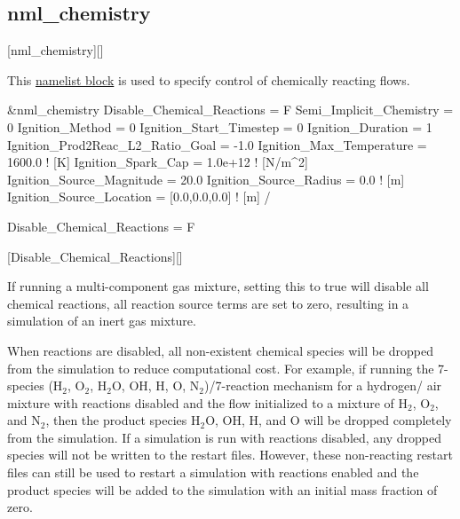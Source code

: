 \subsection{nml\_chemistry}
\label{SEC:nml_chemistry}
\inp*[nmlChemistry]{}[nml\_chemistry][]

This \hyperref[SEC:User_Input]{namelist block}
is used to specify control of chemically reacting flows.

\begin{nmlblocklst}[
,label={LST:nml_chemistry}
,caption={Namelist nml\_chemistry.}
]
&nml_chemistry
  Disable_Chemical_Reactions       = F
  Semi_Implicit_Chemistry          = 0
  Ignition_Method                  = 0
  Ignition_Start_Timestep          = 0
  Ignition_Duration                = 1
  Ignition_Prod2Reac_L2_Ratio_Goal = -1.0
  Ignition_Max_Temperature         = 1600.0         ! [K]
  Ignition_Spark_Cap               = 1.0e+12        ! [N/m^2]
  Ignition_Source_Magnitude        = 20.0
  Ignition_Source_Radius           = 0.0            ! [m]
  Ignition_Source_Location         = [0.0,0.0,0.0]  ! [m]
/
\end{nmlblocklst}


\begin{nmldescitem}
Disable_Chemical_Reactions = F
\end{nmldescitem}
[Disable\_Chemical\_Reactions][]

\begin{nmldescbody}
If running a multi-component gas mixture, setting this to true will disable
all chemical reactions, \thatis all reaction source terms are set to zero,
resulting in a simulation of an inert gas mixture.
 
When reactions are disabled, all non-existent chemical species will be
dropped from the simulation to reduce computational cost. For example, if
running the 7-species ($\mathrm{H_2}$, $\mathrm{O_2}$, $\mathrm{H_2 O}$,
OH, H, O, $\mathrm{N_2}$)\slash 7-reaction mechanism for a hydrogen\slash
air mixture with reactions disabled and the flow initialized to a
mixture of $\mathrm{H_2}$, $\mathrm{O_2}$, and $\mathrm{N_2}$,
then the product species $\mathrm{H_2 O}$, OH, H, and O will be dropped
completely from the simulation.
%
If a simulation is run with reactions disabled, any dropped species
will not be written to the restart files. However, these non-reacting
restart files can still be used to restart a simulation with reactions
enabled and the product species will be added to the simulation with an
initial mass fraction of zero.
\end{nmldescbody}

